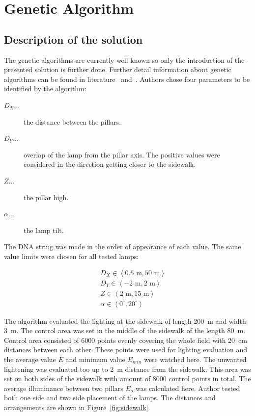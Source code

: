 \section{Genetic Algorithm}
\subsection{Description of the solution}
The genetic algorithms are currently well known so only the introduction of the presented solution is further done. Further detail information about genetic algorithms can be found in literature~\cite{Zelinka2009} and~\cite{Fogel2006}. Authors chose four parameters to be identified by the algorithm:

\begin{description}
	\item [$D_X$...] the distance between the pillars.
	\item [$D_Y$...] overlap of the lamp from the pillar axis. The positive values were considered in the direction getting closer to the sidewalk.
	\item [$Z$...] the pillar high.
	\item [$\alpha$...] the lamp tilt.
\end{description}

The DNA string was made in the order of appearance of each value. The same value limits were chosen for all tested lamps:

\begin{eqnarray}
&&D_X \in \left\langle 0.5 \text{ m}, 50 \text{ m}\right\rangle \label{eq:DXLim}\\
&&D_Y \in \left\langle -2 \text{ m}, 2 \text{ m}\right\rangle \\
&&Z \in \left\langle 2 \text{ m}, 15 \text{ m}\right\rangle \\
&&\alpha \in \left\langle 0^\circ, 20^\circ \right\rangle
\end{eqnarray}

The algorithm evaluated the lighting at the sidewalk of length 200~m and width 3~m. The control area was set in the middle of the sidewalk of the length 80~m. Control area consisted of 6000 points evenly covering the whole field with 20~cm distances between each other. These points were used for lighting evaluation and the average value $\overline{E}$ and minimum value $E_{min}$ were watched here. The unwanted lightening was evaluated too up to 2~m distance from the sidewalk. This area was set on both sides of the sidewalk with amount of 8000 control points in total. The average illuminance between two pillars $\overline{E}_o$ was calculated here. Author tested both one side and two side placement of the lamps. The distances and arrangements are shown in Figure~\ref{fig:sidewalk}.


